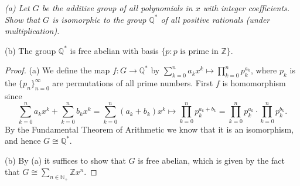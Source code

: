 \begin{problem}\em
(a) Let $G$ be the additive group of all polynomials in $x$ with integer coefficients. Show that $G$ is isomorphic to the group $\mathbb{Q}^*$ of all positive rationals (under multiplication).\par
(b) The group $\mathbb{Q}^*$ is free abelian with basis $\{p:\text{$p$ is prime in $\mathbb{Z}$}\}$.
\end{problem}
\begin{proof}
(a) We define the map $f:G\to\mathbb{Q}^*$ by $\sum_{k=0}^n{a_kx^k}\mapsto \prod_{k=0}^n{p_{k}^{a_k}}$, where $p_k$ is the $\{p_n\}_{n=0}^\infty$ are permutations of all prime numbers. First $f$ is homomorphism since 
$$
\sum_{k=0}^n{a_kx^k}+\sum_{k=0}^n{b_kx^k}=\sum_{k=0}^n{\left( a_k+b_k \right) x^k}\mapsto \prod_{k=0}^n{p_{k}^{a_k+b_k}}=\prod_{k=0}^n{p_{k}^{a_k}}\cdot \prod_{k=0}^n{p_{k}^{b_k}}.
$$
By the Fundamental Theorem of Arithmetic we know that it is an isomorphism, and hence $G\cong\mathbb{Q}^*$.\par
(b) By (a) it suffices to show that $G$ is free abelian, which is given by the fact that $G\cong\sum_{n\in \mathbb{N} _+}{\mathbb{Z} x^n}$.
\end{proof}
